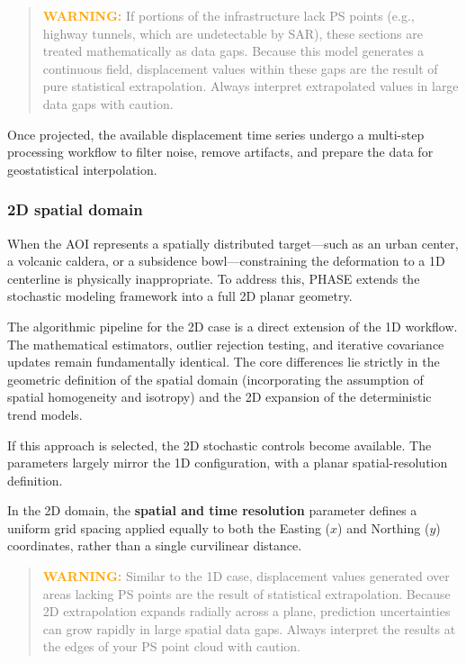 \begin{quote}
    \textcolor{orange}{\textbf{WARNING:}} \textcolor{gray}{If portions of the infrastructure lack PS points (e.g., highway tunnels, which are undetectable by SAR), these sections are treated mathematically as data gaps. Because this model generates a continuous field, displacement values within these gaps are the result of pure statistical extrapolation. Always interpret extrapolated values in large data gaps with caution.}
\end{quote}

Once projected, the available displacement time series undergo a multi-step processing workflow to filter noise, remove artifacts, and prepare the data for geostatistical interpolation.


\subsubsection{2D spatial domain}
When the AOI represents a spatially distributed target---such as an urban center, a volcanic caldera, or a subsidence bowl---constraining the deformation to a 1D centerline is physically inappropriate. To address this, PHASE extends the stochastic modeling framework into a full 2D planar geometry.

The algorithmic pipeline for the 2D case is a direct extension of the 1D workflow. The mathematical estimators, outlier rejection testing, and iterative covariance updates remain fundamentally identical. The core differences lie strictly in the geometric definition of the spatial domain (incorporating the assumption of spatial homogeneity and isotropy) and the 2D expansion of the deterministic trend models.

If this approach is selected, the 2D stochastic controls become available. The parameters largely mirror the 1D configuration, with a planar spatial-resolution definition.

In the 2D domain, the \textbf{spatial and time resolution} parameter defines a uniform grid spacing applied equally to both the Easting ($x$) and Northing ($y$) coordinates, rather than a single curvilinear distance.

\begin{quote}
    \textcolor{orange}{\textbf{WARNING:}} \textcolor{gray}{Similar to the 1D case, displacement values generated over areas lacking PS points are the result of statistical extrapolation. Because 2D extrapolation expands radially across a plane, prediction uncertainties can grow rapidly in large spatial data gaps. Always interpret the results at the edges of your PS point cloud with caution.}
\end{quote}




